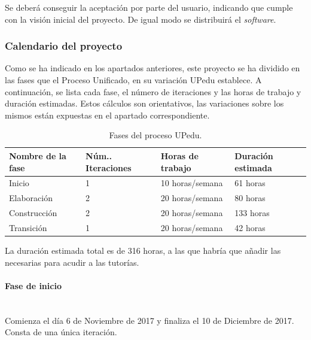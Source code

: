 \documentclass[twoside]{report}
\begin{document}
Se deberá conseguir la aceptación por parte del usuario, indicando que cumple con la visión inicial del proyecto. De igual modo se distribuirá el \textit{software}.

\subsubsection{Calendario del proyecto}

Como se ha indicado en los apartados anteriores, este proyecto se ha dividido en las fases que el Proceso Unificado, en su variación UPedu\cite{upedu} establece. A continuación, se lista cada fase, el número de iteraciones y las horas de trabajo y duración estimadas. Estos cálculos son orientativos, las variaciones sobre los mismos están expuestas en el apartado correspondiente.

\begin{table}[H]
\centering
\begin{tabular}{|l|l|l|l|}
\hline
Nombre de la fase & Núm.. Iteraciones & Horas de trabajo & Duración estimada \\ \hline
Inicio            & 1                 & 10 horas/semana  & 61 horas       \\ \hline
Elaboración       & 2                 & 20 horas/semana  & 80 horas    \\ \hline
Construcción      & 2                 & 20 horas/semana  & 133 horas       \\ \hline
Transición        & 1                 & 20 horas/semana   & 42 horas       \\ \hline
\end{tabular}
\caption{Fases del proceso UPedu.}
\end{table}

La duración estimada total es de 316 horas, a las que habría que añadir las necesarias para acudir a las tutorías.

\paragraph{Fase de inicio}\mbox{}\\

Comienza el día 6 de Noviembre de 2017 y finaliza el 10 de Diciembre de 2017. Consta de una única iteración. 
\end{document}
